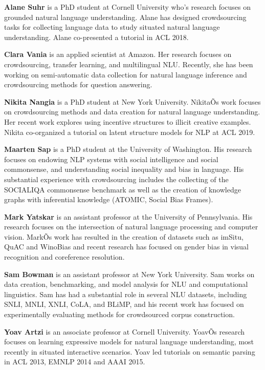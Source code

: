 \begin{bio}
  {\bfseries Alane Suhr} is a PhD student at Cornell University who's research focuses on grounded natural language understanding. Alane has designed crowdsourcing tasks for collecting language data to study situated natural language understanding. Alane co-presented a tutorial in ACL 2018.

  {\bfseries Clara Vania} is an applied scientist at Amazon. Her research focuses on crowdsourcing, transfer learning, and multilingual NLU. Recently, she has been working on semi-automatic data collection for natural language inference and crowdsourcing methods for question answering.

  {\bfseries Nikita Nangia} is a PhD student at New York University. NikitaÕs work focuses on crowdsourcing methods and data creation for natural language understanding. Her recent work explores using incentive structures to illicit creative examples. Nikita co-organized a tutorial on latent structure models for NLP at ACL 2019.

    {\bfseries Maarten Sap} is a PhD student at the University of Washington.
His research focuses on endowing NLP systems with social intelligence and social commonsense, and understanding social inequality and bias in language. His substantial experience with crowdsourcing includes the collecting of the SOCIALIQA commonsense benchmark as well as the creation of knowledge graphs with inferential knowledge (ATOMIC, Social Bias Frames).

  {\bfseries Mark Yatskar} is an assistant professor at the University of Pennsylvania. His research focuses on the intersection of natural language processing and computer vision. MarkÕs work has resulted in the creation of datasets such as imSitu, QuAC and WinoBias and recent research has focused on gender bias in visual recognition and coreference resolution.

  {\bfseries Sam Bowman} is an assistant professor at New York University.
Sam works on data creation, benchmarking, and model analysis for NLU and computational linguistics. Sam has had a substantial role in several NLU datasets, including SNLI, MNLI, XNLI, CoLA, and BLiMP, and his recent work has focused on experimentally evaluating methods for crowdsourced corpus construction.

    {\bfseries Yoav Artzi} is an associate professor at Cornell University.
YoavÕs research focuses on learning expressive models for natural language understanding, most recently in situated interactive scenarios. Yoav led tutorials on semantic parsing in ACL 2013, EMNLP 2014 and AAAI 2015.

\end{bio}

